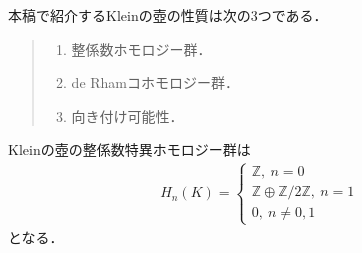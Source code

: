 \documentclass[uplatex]{jsarticle}
\begin{document}
本稿で紹介するKleinの壺の性質は次の3つである．
\begin{quote}
  \begin{enumerate}[label=(\arabic*)]
    \item 整係数ホモロジー群．
    \item de Rhamコホモロジー群．
    \item 向き付け可能性．
  \end{enumerate}
\end{quote}
\begin{theorem}\label{singular}
  Kleinの壺の整係数特異ホモロジー群は
  \begin{eqnarray*}
    H_n(K)=
    \begin{cases}
      \mathbb{Z},\ n=0                             \\
      \mathbb{Z}\oplus\mathbb{Z}/2\mathbb{Z},\ n=1 \\
      0,\ n\neq 0,1
    \end{cases}
  \end{eqnarray*}
  となる．
\end{theorem}
\end{document}
